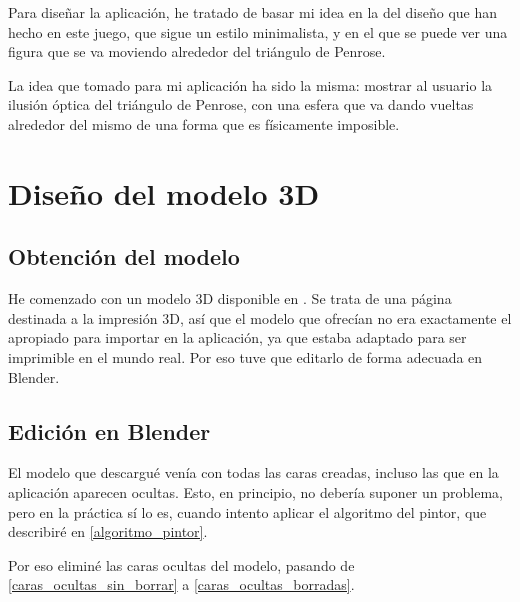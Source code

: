 \documentclass[a4paper,12pt]{article}
\begin{document}
Para diseñar la aplicación, he tratado de basar mi idea en la del diseño que han hecho en este juego, que sigue un estilo minimalista, y en el que se puede ver una figura que se va moviendo alrededor del triángulo de Penrose.

La idea que tomado para mi aplicación ha sido la misma: mostrar al usuario la ilusión óptica del triángulo de Penrose, con una esfera que va dando vueltas alrededor del mismo de una forma que es físicamente imposible.

\section{Diseño del modelo 3D}

\subsection{Obtención del modelo}

He comenzado con un modelo 3D disponible en \cite{modeloTriangulo}. Se trata de una página destinada a la impresión 3D, así que el modelo que ofrecían no era exactamente el apropiado para importar en la aplicación, ya que estaba adaptado para ser imprimible en el mundo real. Por eso tuve que editarlo de forma adecuada en Blender.

\subsection{Edición en Blender} \label{edicion_blender}

El modelo que descargué venía con todas las caras creadas, incluso las que en la aplicación aparecen ocultas. Esto, en principio, no debería suponer un problema, pero en la práctica sí lo es, cuando intento aplicar el algoritmo del pintor, que describiré en \ref{algoritmo_pintor}.

Por eso eliminé las caras ocultas del modelo, pasando de \ref{caras_ocultas_sin_borrar} a \ref{caras_ocultas_borradas}.
\end{document}

